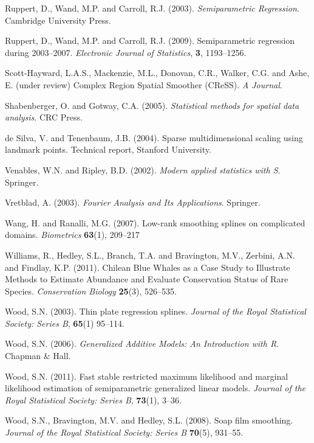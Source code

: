 \documentclass[useAMS, referee]{biom}
\begin{document}
\begin{thebibliography}{99}
\bibitem{} Ruppert, D., Wand, M.P. and Carroll, R.J. (2003). \textit{Semiparametric Regression}. Cambridge University Press.

\bibitem{} Ruppert, D., Wand, M.P. and Carroll, R.J. (2009). Semiparametric regression during 2003--2007. \textit{Electronic Journal of Statistics}, \textbf{3}, 1193--1256.

\bibitem{} Scott-Hayward, L.A.S., Mackenzie, M.L., Donovan, C.R., Walker, C.G. and Ashe, E. (under review) Complex Region Spatial Smoother (CReSS). \textit{A Journal}.

\bibitem{} Shabenberger, O. and Gotway, C.A. (2005). \textit{Statistical methods for spatial data analysis}. CRC Press.

\bibitem{} de Silva, V. and Tenenbaum, J.B. (2004). Sparse multidimensional scaling using landmark points. Technical report, Stanford University.

\bibitem{} Venables, W.N. and Ripley, B.D. (2002). \textit{Modern applied statistics with S}. Springer.

\bibitem{} Vretblad, A. (2003). \textit{Fourier Analysis and Its Applications}. Springer.

\bibitem{} Wang, H. and Ranalli, M.G. (2007). Low-rank smoothing splines on complicated domains. \textit{Biometrics} \textbf{63}(1), 209--217

\bibitem{} Williams, R., Hedley, S.L., Branch, T.A. and Bravington, M.V., Zerbini, A.N. and Findlay, K.P. (2011). Chilean Blue Whales as a Case Study to Illustrate Methods to Estimate Abundance and Evaluate Conservation Status of Rare Species. \textit{Conservation Biology} \textbf{25}(3), 526--535.

\bibitem{} Wood, S.N. (2003). Thin plate regression splines. \textit{Journal of the Royal Statistical Society: Series B}, \textbf{65}(1) 95--114.

\bibitem{} Wood, S.N. (2006). \textit{Generalized Additive Models: An Introduction with R}. Chapman \& Hall.

\bibitem{} Wood, S.N. (2011). Fast stable restricted maximum likelihood and marginal likelihood estimation of semiparametric generalized linear models. \textit{Journal of the Royal Statistical Society: Series B}, \textbf{73}(1), 3--36.

\bibitem{} Wood, S.N., Bravington, M.V. and Hedley, S.L. (2008). Soap film smoothing. \textit{Journal of the Royal Statistical Society: Series B} \textbf{70}(5), 931--55.

\end{thebibliography}
\end{document}
